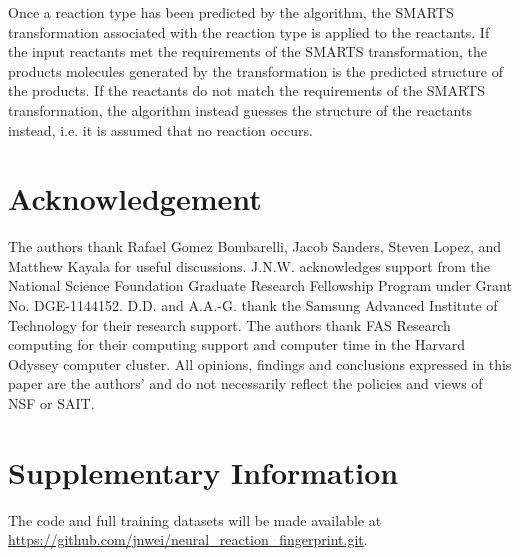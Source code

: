 Once a reaction type has been predicted by the algorithm, the SMARTS transformation associated with the reaction type is applied to the reactants. If the input reactants met the requirements of the SMARTS transformation, the products molecules generated by the transformation is the predicted structure of the products. If the reactants do not match the requirements of the SMARTS transformation, the algorithm instead guesses the structure of the reactants instead, i.e. it is assumed that no reaction occurs. 

\section{Acknowledgement}
The authors thank Rafael Gomez Bombarelli, Jacob Sanders, Steven Lopez, and Matthew Kayala for useful discussions. J.N.W. acknowledges support from the National Science Foundation Graduate Research Fellowship Program under Grant No. DGE-1144152. D.D. and A.A.-G. thank the Samsung Advanced Institute of Technology for their research support. The authors thank FAS Research computing for their computing support and computer time in the Harvard Odyssey computer cluster. All opinions, findings and conclusions expressed in this paper are the authors' and do not necessarily reflect the policies and views of NSF or SAIT.

\section{Supplementary Information}
The code and full training datasets will be made available at \url{https://github.com/jnwei/neural_reaction_fingerprint.git}.



